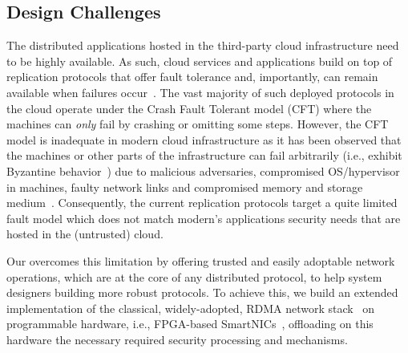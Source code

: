 \subsection{Design Challenges}
 The distributed applications hosted in the third-party cloud infrastructure need to be highly available. As such, cloud services and applications build on top of replication protocols that offer fault tolerance and, importantly, can remain available when failures occur~\cite{Jimenez-Peris2001}. The vast majority of such deployed protocols in the cloud operate under the Crash Fault Tolerant model (CFT) where the machines can {\em only} fail by crashing or omitting some steps. However, the CFT model is inadequate in modern cloud infrastructure as it has been observed that the machines or other parts of the infrastructure can fail arbitrarily (i.e., exhibit Byzantine behavior~\cite{Lamport:1982}) due to malicious adversaries, compromised OS/hypervisor in machines, faulty network links and compromised memory and storage medium~\cite{Gunawi_bugs-in-the-cloud, ciad, fast-08-corruption, security-one-sided-communication, accountable-cloud}. Consequently, the current replication protocols target a quite limited fault model which does not match modern's applications security needs that are hosted in the (untrusted) cloud.

 Our \projecttitle{} overcomes this limitation by offering  trusted and easily adoptable network operations, which are at the core of any distributed protocol, to help system designers building more robust protocols. To achieve this, we build an extended implementation of the classical, widely-adopted, RDMA network stack~\cite{rdma} on programmable hardware, i.e., FPGA-based SmartNICs~\cite{u280_smartnics}, offloading on this hardware the necessary required security processing and mechanisms. 



